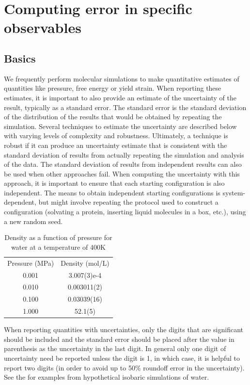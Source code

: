 \section{Computing error in specific observables}
\label{sec:specific}

\subsection{Basics}
We frequently perform molecular simulations to make quantitative estimates of quantities like pressure, free energy or yield strain.  When reporting these estimates, it is important to also provide an estimate of the uncertainty of the result, typically as a standard error.  The standard error is the standard deviation of the distribution of the results that would be obtained by repeating the simulation.  Several techniques to estimate the uncertainty are described below with varying levels of complexity and robustness.  Ultimately, a technique is robust if it can produce an uncertainty estimate that is consistent with the standard deviation of results from actually repeating the simulation and analysis of the data.  The standard deviation of results from independent results can also be used when other approaches fail.  When computing the uncertainty with this approach, it is important to ensure that each starting configuration is also independent.  The means to obtain independent starting configurations is system-dependent, but might involve repeating the protocol used to construct a configuration (solvating a protein, inserting liquid molecules in a box, etc.), using a new random seed.

\begin{table}
    \begin{tabular}{S S}
      \toprule
       {Pressure (MPa)} & {Density (mol/L)} \\
      0.001 & 3.007(3)e-4 \\
      0.010 & 0.003011(2) \\
      0.100 & 0.03039(16) \\
      1.000 & 52.1(5) \\
      \bottomrule
    \end{tabular}
  \caption{Density as a function of pressure for water at a temperature of 400K}
  \label{tab:uncertainties}
\end{table}

When reporting quantities with uncertainties, only the digits that are significant should be included and the standard error should be placed after the value in parenthesis as the uncertainty in the last digit.  In general only one digit of uncertainty need be reported unless the digit is 1, in which case, it is helpful to report two digits (in order to avoid up to 50\% roundoff error in the uncertainty).  See the  for examples from hypothetical isobaric simulations of water.

